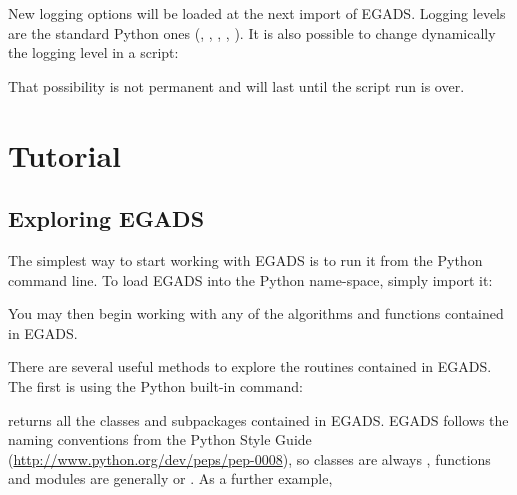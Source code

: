 \documentclass[a4paper,10pt,openany,english]{sphinxmanual}
\begin{document}
New logging options will be loaded at the next import of EGADS. Logging levels are the standard Python ones (, , , , ). It is also possible to change dynamically the logging level in a script:

\begin{sphinxVerbatim}[commandchars=\\\{\}]
\end{sphinxVerbatim}

That possibility is not permanent and will last until the script run is over.


\chapter{Tutorial}
\label{tutorial::doc}\label{tutorial:tutorial}

\section{Exploring EGADS}
\label{tutorial:exploring-egads}
The simplest way to start working with EGADS is to run it from the Python command line.
To load EGADS into the Python name-space, simply import it:

\begin{sphinxVerbatim}[commandchars=\\\{\}]
 
\end{sphinxVerbatim}

You may then begin working with any of the algorithms and functions contained in EGADS.

There are several useful methods to explore the routines contained in EGADS.
The first is using the Python built-in  command:

\begin{sphinxVerbatim}[commandchars=\\\{\}]
\end{sphinxVerbatim}

returns all the classes and subpackages contained in EGADS. EGADS follows the naming conventions from the Python Style Guide (\url{http://www.python.org/dev/peps/pep-0008}), so classes are always , functions and modules are generally  or . As a further example,
\end{document}
